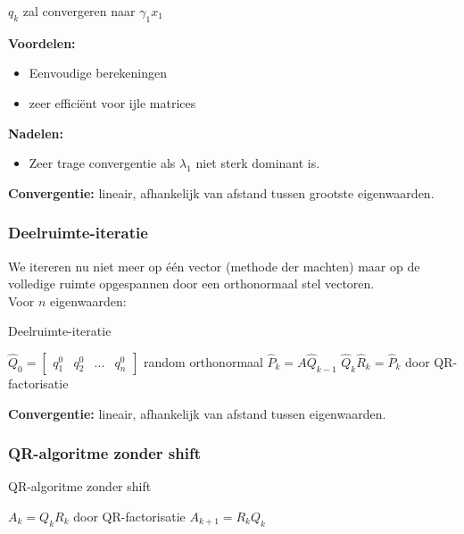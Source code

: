 \documentclass{article}
\begin{document}
	$q_k$ zal convergeren naar $\gamma_1 x_1$
	
	\textbf{Voordelen:}
	\begin{itemize}
		\item Eenvoudige berekeningen
		\item zeer efficiënt voor ijle matrices
	\end{itemize}
	\textbf{Nadelen:}
	\begin{itemize}
		\item Zeer trage convergentie als $\lambda_1$ niet sterk dominant is.
	\end{itemize}

	\textbf{Convergentie:} lineair, afhankelijk van afstand tussen grootste eigenwaarden.
		
	\subsubsection{Deelruimte-iteratie}
	
	We itereren nu niet meer op één vector (methode der machten) maar op de volledige ruimte opgespannen door een orthonormaal stel vectoren.\\
	
	Voor $n$ eigenwaarden:
	
	\begin{algorithm}[!ht]
		\caption{Deelruimte-iteratie}
		\begin{algorithmic}[1]
				\State $\hat{Q}_0 = 
				\begin{bmatrix}
					q_1^0 & q_2^0 & ... & q_n^0
				\end{bmatrix}
				$ random orthonormaal
					\State $\hat{P}_k = A\hat{Q}_{k-1}$
					\State $\hat{Q}_k \hat{R}_k = \hat{P}_k$ door QR-factorisatie
				\EndFor
			\EndProcedure
		\end{algorithmic}
	\end{algorithm}

	\textbf{Convergentie:} lineair, afhankelijk van afstand tussen eigenwaarden.
	
	\subsubsection{QR-algoritme zonder shift}
	
	\begin{algorithm}[!ht]
		\caption{QR-algoritme zonder shift}
		\begin{algorithmic}[1]
				\State $A_k = Q_k R_k$ door QR-factorisatie
				\State $A_{k+1} = R_k Q_k$
			\EndFor
			\EndProcedure
		\end{algorithmic}
	\end{algorithm}
\end{document}

